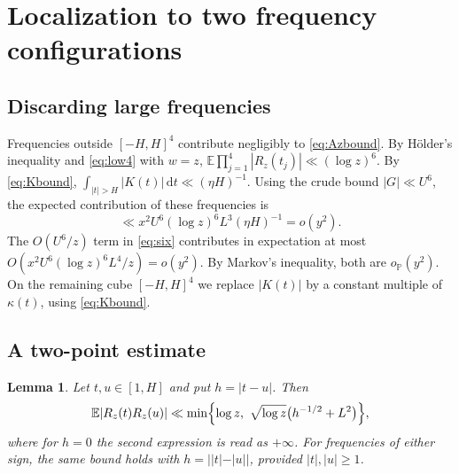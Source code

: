 \documentclass[11pt]{amsart}
\newtheorem{lemma}[theorem]{Lemma}
\theoremstyle{remark}
\numberwithin{equation}{section}
\newcommand{\E}{\mathbb{E}}
\renewcommand{\P}{\mathbb{P}}
\newcommand{\dd}{\,\mathrm{d}}
\begin{document}
\section{Localization to two frequency configurations}\label{sec:local2}

\subsection{Discarding large frequencies}
Frequencies outside $[-H,H]^4$ contribute negligibly to \eqref{eq:Azbound}. By H\"older's inequality and \eqref{eq:low4} with $w=z$, $\E\prod_{j=1}^4|R_z(t_j)|\ll(\log z)^6$. By \eqref{eq:Kbound}, $\int_{|t|>H}|K(t)|\dd t\ll(\eta H)^{-1}$. Using the crude bound $|G|\ll U^6$, the expected contribution of these frequencies is
\[
\ll x^2U^6(\log z)^6L^3(\eta H)^{-1}=o(y^2).
\]
The $O(U^6/z)$ term in \eqref{eq:six} contributes in expectation at most $O(x^2U^6(\log z)^6L^4/z)=o(y^2)$. By Markov's inequality, both are $o_\P(y^2)$. On the remaining cube $[-H,H]^4$ we replace $|K(t)|$ by a constant multiple of $\kappa(t)$, using \eqref{eq:Kbound}.

\subsection{A two-point estimate}

\begin{lemma}\label{lem:twopoint}
Let $t,u\in[1,H]$ and put $h=|t-u|$. Then
\begin{equation}\label{eq:twopoint}
\E|R_z(t)R_z(u)|\ll\min\Bigl\{\log z,\ \sqrt{\log z}\bigl(h^{-1/2}+L^2\bigr)\Bigr\},
\end{equation}
where for $h=0$ the second expression is read as $+\infty$. For frequencies of either sign, the same bound holds with $h=||t|-|u||$, provided $|t|,|u|\ge1$.
\end{lemma}
\end{document}
